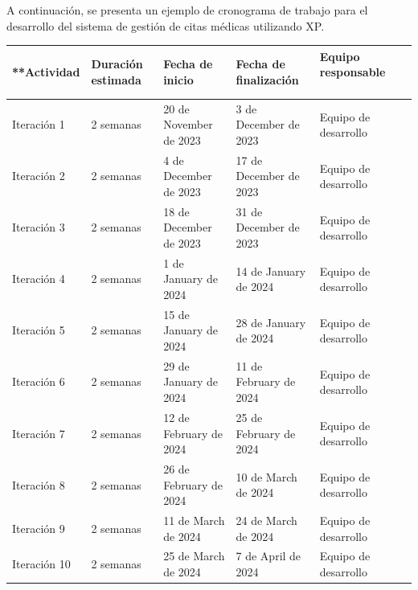 \documentclass{article}
\theoremstyle{mytheoremstyle}
\theoremstyle{mytheoremstyle}
\theoremstyle{myproblemstyle}
\begin{document}
A continuación, se presenta un ejemplo de cronograma de trabajo para el
desarrollo del sistema de gestión de citas médicas utilizando XP.
\newpage



\begin{table}[!ht]
	\centering
	\begin{adjustbox}{max width=1.15\textwidth}
		\small
		\begin{tabular}{|l|l|l|l|l|l|}
			\hline
			**Actividad                & Duración estimada & Fecha de inicio        & Fecha de finalización  & Equipo responsable  ~       \\ \hline
			Iteración 1                & 2 semanas         & 20 de November de 2023 & 3 de December de 2023  & Equipo de desarrollo  ~     \\ \hline
			Iteración 2                & 2 semanas         & 4 de December de 2023  & 17 de December de 2023 & Equipo de desarrollo  ~     \\ \hline
			Iteración 3                & 2 semanas         & 18 de December de 2023 & 31 de December de 2023 & Equipo de desarrollo  ~     \\ \hline
			Iteración 4                & 2 semanas         & 1 de January de 2024   & 14 de January de 2024  & Equipo de desarrollo  ~     \\ \hline
			Iteración 5                & 2 semanas         & 15 de January de 2024  & 28 de January de 2024  & Equipo de desarrollo  ~     \\ \hline
			Iteración 6                & 2 semanas         & 29 de January de 2024  & 11 de February de 2024 & Equipo de desarrollo  ~     \\ \hline
			Iteración 7                & 2 semanas         & 12 de February de 2024 & 25 de February de 2024 & Equipo de desarrollo  ~     \\ \hline
			Iteración 8                & 2 semanas         & 26 de February de 2024 & 10 de March de 2024    & Equipo de desarrollo  ~     \\ \hline
			Iteración 9                & 2 semanas         & 11 de March de 2024    & 24 de March de 2024    & Equipo de desarrollo  ~     \\ \hline
			Iteración 10               & 2 semanas         & 25 de March de 2024    & 7 de April de 2024     & Equipo de desarrollo  ~     \\ \hline

\end{tabular}
\end{adjustbox}
\end{table}
\end{document}
